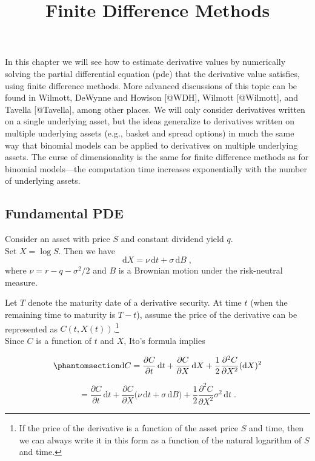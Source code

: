 \documentclass[
  letterpaper,
  DIV=11,
  numbers=noendperiod]{scrartcl}
\title{Finite Difference Methods}
\author{}
\date{}
\theoremstyle{definition}
\theoremstyle{remark}
\begin{document}
\maketitle


In this chapter we will see how to estimate derivative values by
numerically solving the partial differential equation (pde) that the
derivative value satisfies, using finite difference methods. More
advanced discussions of this topic can be found in Wilmott, DeWynne and
Howison {[}@WDH{]}, Wilmott {[}@Wilmott{]}, and Tavella {[}@Tavella{]},
among other places. We will only consider derivatives written on a
single underlying asset, but the ideas generalize to derivatives written
on multiple underlying assets (e.g., basket and spread options) in much
the same way that binomial models can be applied to derivatives on
multiple underlying assets. The curse of dimensionality is the same for
finite difference methods as for binomial models---the computation time
increases exponentially with the number of underlying assets.

\subsection{Fundamental PDE}\label{sec-fundamentalpde}

Consider an asset with price \(S\) and constant
dividend yield \(q\).\\
Set \(X=\log S\). Then we have
\[\mathrm{d} X = \nu\,\mathrm{d} t+\sigma\,\mathrm{d} B\; ,\] where
\(\nu =r-q-\sigma^2/2\) and \(B\) is a Brownian motion under the
risk-neutral measure.

Let \(T\) denote the maturity date of a derivative security. At time
\(t\) (when the remaining time to maturity is \(T-t\)), assume the price
of the derivative can be represented as \(C(t,X(t))\).\footnote{If the
  price of the derivative is a function of the asset price \(S\) and
  time, then we can always write it in this form as a function of the
  natural logarithm of \(S\) and time.}\\
Since \(C\) is a function of \(t\) and \(X\), Ito's formula implies

\begin{equation}\phantomsection\label{eq-2}{
\mathrm{d} C  = \frac{\partial C}{\partial t}\,\mathrm{d} t + \frac{\partial C}{\partial X}\,\mathrm{d} X +\frac{1}{2}\frac{\partial^2 C}{\partial X^2}(\mathrm{d} X)^2
}\end{equation}

\[
=\frac{\partial C}{\partial t}\,\mathrm{d} t+ \frac{\partial C}{\partial X}\big(\nu\,\mathrm{d} t+\sigma\,\mathrm{d} B\big) + \frac{1}{2}\frac{\partial^2 C}{\partial X^2}\sigma^2\,\mathrm{d} t\;.
\]
\end{document}
